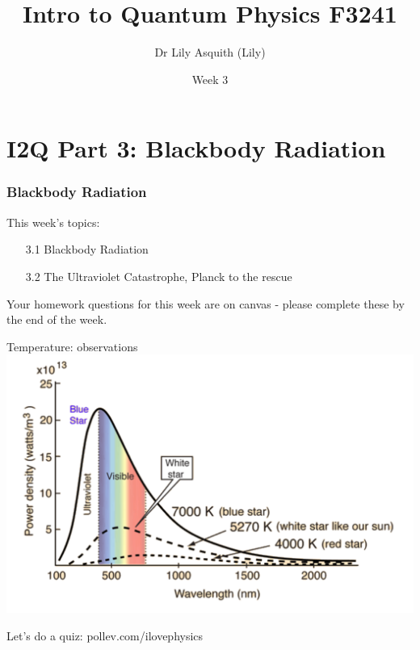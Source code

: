 


% 
\title[ Intro to Quantum Physics]{Intro to Quantum Physics F3241}
\author[Dr Lily Asquith (Lily)]{ Dr Lily Asquith (Lily)}
\date[Week 3]{ Week 3}





\begin{frame}
\titlepage
\end{frame} 

\section{I2Q Part 3: Blackbody Radiation}
\begin{frame}
\frametitle{Blackbody Radiation} 
\normalsize

This week's topics:\\[3ex]

\begin{itemize}
\item[3.1] Blackbody Radiation\\[3ex]
\item[3.2] The Ultraviolet Catastrophe, Planck to the rescue\\[3ex]
\end{itemize}

Your homework questions for this week are on canvas - please complete these by the end of the week.
\end{frame} 
 
 
\begin{frame}{Temperature: observations}
\small
\includegraphics[scale=0.45]{bbspectrum}

Let's do a quiz: pollev.com/ilovephysics

\end{frame}


